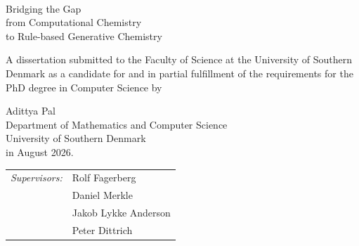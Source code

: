 \begin{center}

\vspace*{2cm}

\hrulefill\\[0.2cm]
{\LARGE Bridging the Gap}\\[0.2cm]
{\LARGE from Computational Chemistry}\\[0.2cm]
{\LARGE to Rule-based Generative Chemistry}\\
\hrulefill
\end{center}

\vfill
\begin{minipage}{0.8\textwidth}
\noindent \small{A dissertation submitted to the Faculty of Science at the University of Southern Denmark as a candidate for and in partial fulfillment of the requirements for the PhD degree in Computer Science by}
\end{minipage}
\vfill

\begin{flushright}
{\large Adittya Pal} \\
{\Large Department of Mathematics and Computer Science} \\
{\Large University of Southern Denmark}\\[1cm]
\vspace{1cm}
in August 2026.
\end{flushright}
\vfill

\begin{tabular}{ll}
	\emph{Supervisors:} & Rolf Fagerberg \\
		& Daniel Merkle \\
		& Jakob Lykke Anderson \\
		& Peter Dittrich
\end{tabular}
\vspace{2cm}

\newpage


